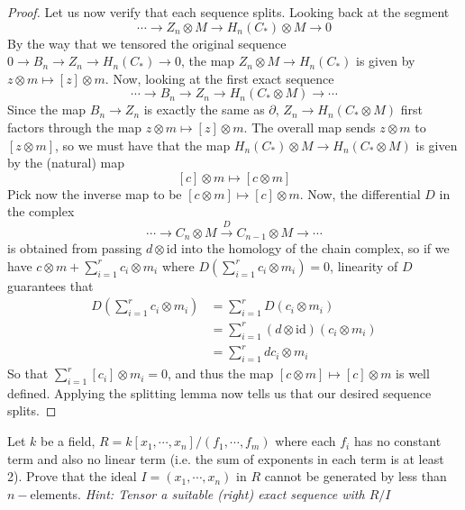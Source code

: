 \documentclass[12pt,reqno]{amsart}
\numberwithin{theorem}{section}
\theoremstyle{definition}
\theoremstyle{remark}
\numberwithin{equation}{section}
\newcommand{\del}{\partial}
\theoremstyle{definition}
\newcommand{\id}{\mathrm{id}}
\begin{document}
\begin{proof}
    Let us now verify that each sequence splits.  Looking back at the segment 
    $$\cdots \rightarrow Z_n \otimes M \rightarrow H_n(C_*) \otimes M \rightarrow 0$$
    By the way that we tensored the original sequence $0 \rightarrow B_n\rightarrow Z_n \rightarrow H_n(C_*) \rightarrow 0$, the map $Z_n \otimes M \rightarrow H_n(C_*)$ is given by $z \otimes m \mapsto [z]\otimes m$. Now, looking at the first exact sequence  
    $$\cdots\rightarrow  B_n\rightarrow Z_n\rightarrow H_n(C_*\otimes M) \rightarrow \cdots$$
    Since the map $B_n \rightarrow Z_n$ is exactly the same as $\del$, $Z_n\rightarrow H_n(C_*\otimes M)$ first factors through the map $z \otimes m \mapsto [z]\otimes m$. The overall map sends $z\otimes m$ to $[z\otimes m]$, so we must have that the map $H_n(C_*)\otimes M \rightarrow H_n(C_*\otimes M)$ is given by the (natural) map 
    $$[c] \otimes m \mapsto [c\otimes m]$$
    Pick now the inverse map to be $[c\otimes m] \mapsto [c]\otimes m$. Now, the differential $D$ in the complex
    $$ \cdots \rightarrow C_n\otimes M \xrightarrow{D} C_{n-1} \otimes M \rightarrow \cdots$$
    is obtained from passing $d\otimes \id $ into the homology of the chain complex, so if we have $c\otimes m  + \sum_{i=1}^r c_i\otimes m_i$ where $D(\sum_{i=1}^r c_i\otimes m_i )= 0 $, linearity of $D$ guarantees that 
    \begin{align*}
        D\left(\sum_{i=1}^r c_i\otimes m_i \right ) &= \sum_{i=1}^rD( c_i\otimes m_i) \\
        &= \sum_{i=1}^r(d\otimes \id)( c_i\otimes m_i)  \\
        &= \sum_{i=1}^rdc_i\otimes m_i
    \end{align*} 
    So that $\sum_{i=1}^r[c_i]\otimes m_i = 0$, and thus the map $[c\otimes m] \mapsto [c]\otimes m$ is well defined. Applying the splitting lemma now tells us that our desired sequence splits.
\end{proof}
\begin{exercise}
    Let $k$ be a field, $R = k[x_1,\cdots,x_n]/(f_1,\cdots,f_m)$ where each $f_i$ has no constant term and also no linear term (i.e. the sum of exponents in each term is at least 2). Prove that the ideal $I=(x_1,\cdots,x_n)$ in $R$ cannot be generated by less than $n-$elements. \textit{Hint: Tensor a suitable (right) exact sequence with $R/I$}
\end{exercise}
\printbibliography
\end{document}
